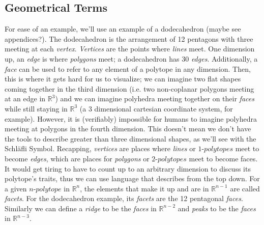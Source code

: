 \documentclass{article}
\begin{document}
\subsection{Geometrical Terms}
For ease of an example, we'll use an example of a dodecahedron (maybe see appendices?). 
The dodecahedron is the arrangement of 12 pentagons with three meeting at each \emph{vertex}. \emph{Vertices} are the points where \emph{lines} meet. 
One dimension up, an \emph{edge} is where \emph{polygons} meet; a dodecahedron has 30 \emph{edges}. 
Additionally, a \emph{face} can be used to refer to any element of a polytope in any dimension. Then, this is where it gets hard for us to visualize; 
we can imagine two flat shapes coming together in the third dimension 
(i.e. two non-coplanar polygons meeting at an edge in $\mathbb{R}^3$) and we can imagine polyhedra meeting together on their \emph{faces} while still staying in 
$\mathbb{R}^3$ (a 3 dimensional cartesian coordinate system, for example). 
However, it is (verifiably) impossible for humans to imagine polyhedra meeting at polygons in the fourth dimension. 
This doesn't mean we don't have the tools to describe greater than three dimensional shapes, as we'll see with the Schläfli Symbol. 
Recapping, \emph{vertices} are places where \emph{lines} or $1$-$polytopes$ meet to become \emph{edges}, 
which are places for \emph{polygons} or $2$-$polytopes$ meet to become faces. 
It would get tiring to have to count up to an arbitrary dimension to discuss its polytope's traits, thus we can use language that describes from the top down. 
For a given $n$-$polytope$ in $\mathbb{R}^n$, the elements that make it up and are in $\mathbb{R}^{n-1}$ are called \emph{facets}. 
For the dodecahedron example, its \emph{facets} are the 12 pentagonal \emph{faces}. 
Similarly we can define a \emph{ridge} to be the \emph{faces} in $\mathbb{R}^{n-2}$ and \emph{peaks} to be the \emph{faces} in $\mathbb{R}^{n-3}$.
\end{document}
